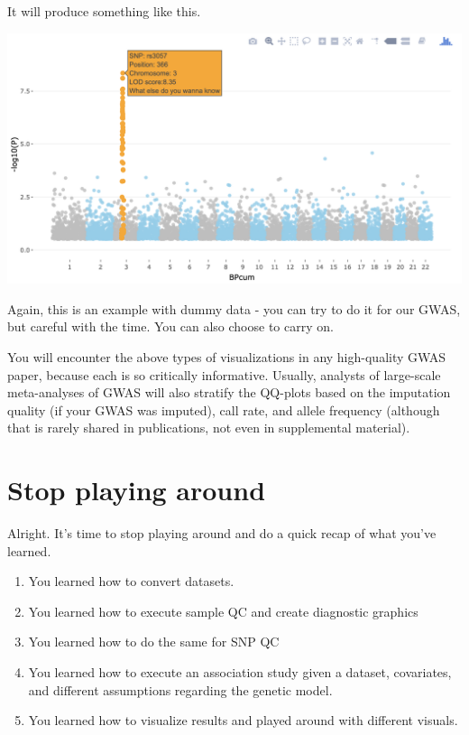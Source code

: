 \documentclass[
]{book}
\providecommand{\tightlist}{%
  \setlength{\itemsep}{0pt}\setlength{\parskip}{0pt}}
\begin{document}
It will produce something like this.

\includegraphics{img/_gwas/interactive_plot.png}

Again, this is an example with dummy data - you can try to do it for our GWAS, but careful with the time. You can also choose to carry on.

You will encounter the above types of visualizations in any high-quality GWAS paper, because each is so critically informative. Usually, analysts of large-scale meta-analyses of GWAS will also stratify the QQ-plots based on the imputation quality (if your GWAS was imputed), call rate, and allele frequency (although that is rarely shared in publications, not even in supplemental material).

\hypertarget{stop-playing-around}{%
\section{Stop playing around}\label{stop-playing-around}}

Alright. It's time to stop playing around and do a quick recap of what you've learned.

\begin{enumerate}
\def\labelenumi{\arabic{enumi}.}
\tightlist
\item
  You learned how to convert datasets.
\item
  You learned how to execute sample QC and create diagnostic graphics
\item
  You learned how to do the same for SNP QC
\item
  You learned how to execute an association study given a dataset, covariates, and different assumptions regarding the genetic model.
\item
  You learned how to visualize results and played around with different visuals.
\end{enumerate}
\end{document}
